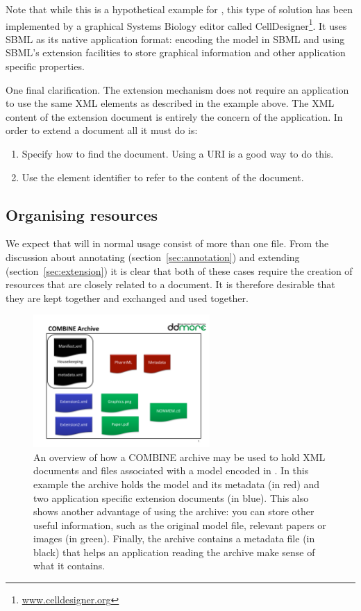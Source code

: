 Note that while this is a hypothetical example for \pharmml, this type
of solution has been implemented by a graphical Systems Biology editor
called CellDesigner\footnote{\url{www.celldesigner.org}}. It uses SBML
as its native application format: encoding the model in SBML and using
SBML's extension facilities to store graphical information and other
application specific properties.

One final clarification. The extension mechanism does not require an
application to use the same XML elements as described in the example
above. The XML content of the extension document is entirely the
concern of the application. In order to extend a \pharmml document
all it must do is:
\begin{enumerate}
\item Specify how to find the \pharmml document. Using a URI is a good
  way to do this.
\item Use the element identifier to refer to the content of the \pharmml document.
\end{enumerate}

\subsection{Organising \pharmml resources}
\label{sec:pharmml-archive}

We expect that \pharmml will in normal usage consist of more than one
file. From the discussion about annotating
(section~\ref{sec:annotation}) and extending
(section~\ref{sec:extension}) \pharmml it is clear that both of these
cases require the creation of resources that are closely
related to a \pharmml document. It is therefore desirable that they
are kept together and exchanged and used together.

\begin{figure}[htb]
\centering
  \includegraphics[width=0.6\textwidth]{Figures/AchiveOverview}
  \caption{An overview of how a COMBINE archive may be used to hold
    XML documents and files associated with a model encoded in
    \pharmml. In this example the archive holds the model and its
    metadata (in red) and two application specific extension
    documents (in blue). This also shows another advantage of using
    the archive: you can store other useful information, such as the
    original model file, relevant papers or images (in
    green). Finally, the archive contains a metadata file (in black)
    that helps an application reading the archive make sense of what
    it contains.}
  \label{fig:moml-archive-overview}
\end{figure}


